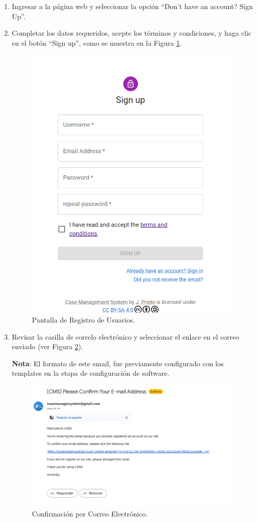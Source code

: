 \begin{enumerate}
    \item Ingresar a la página web y seleccionar la opción ``Don't have an account? Sign Up''.
    \item Completar los datos requeridos, acepte los términos y condiciones, y haga clic en el botón ``Sign up'', como se muestra en la Figura \ref{fig:signup}.


    \begin{figure}[H]
        \centering
        \includegraphics[width=0.7\linewidth]{fig/signup.png}
        \caption{Pantalla de Registro de Usuarios.}
        \label{fig:signup}
    \end{figure}

    \item Revisar la casilla de correlo electrónico y seleccionar el enlace en el correo enviado (ver Figura \ref{fig:confirm-email}).

    \textbf{Nota}: El formato de este email, fue previamente configurado con los templates en la etapa de configuración de software.

    \begin{figure}[H]
        \centering
        \includegraphics[width=1\linewidth]{fig/confirm-email.png}
        \caption{Confirmación por Correo Electrónico.}
        \label{fig:confirm-email}
    \end{figure}
\end{enumerate}

